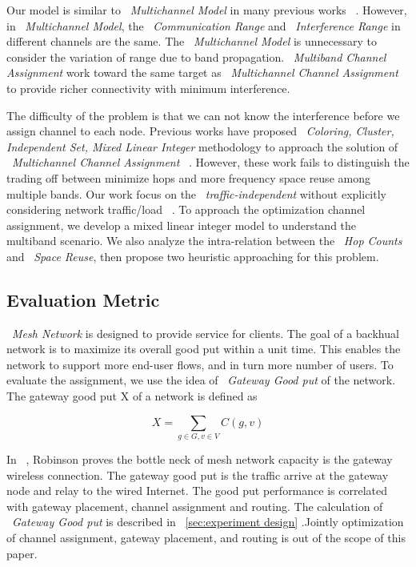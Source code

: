 Our model is similar to ~\emph{Multichannel Model} in many previous works ~\cite{tang2005interference,yuan2006cross,si2010overview}. However, in ~\emph{Multichannel Model}, the ~\emph{Communication Range} and ~\emph{Interference Range} in different channels are the same. The ~\emph{Multichannel Model} is unnecessary to consider the variation of range due to band propagation.
~\emph{Multiband Channel Assignment} work toward the same target as ~\emph{Multichannel Channel Assignment} to provide richer connectivity with minimum interference.

The difficulty of the problem is that we can not know the interference before we assign channel to each node. Previous works have proposed ~\emph{Coloring, Cluster, Independent Set, Mixed Linear Integer} methodology to approach the solution of ~\emph{Multichannel Channel Assignment} ~\cite{mishra2005weighted,peng2012efficient,tang2005interference}. 
However, these work fails to distinguish the trading off between minimize hops and more frequency space reuse among multiple bands.
Our work focus on the ~\emph{traffic-independent} 
without explicitly considering network traffic/load ~\cite{marina2010topology}.
To approach the optimization channel assignment, we develop a mixed linear integer model to understand the multiband scenario. We also analyze the intra-relation between the ~\emph{Hop Counts} and ~\emph{Space Reuse}, then propose two heuristic approaching for this problem.

\subsection{Evaluation Metric}
\label{subsec:metric}
~\emph{Mesh Network} is designed to provide service for clients. The goal of a backhual network is to maximize its overall good put within a unit time. 
This enables the network to support more end-user flows, and in turn more number of users. To evaluate the assignment, we use the idea of ~\emph{Gateway Good put} of the network. The gateway good put X of a network is defined as

\begin{equation}
\label{eq:goodput}
X=\sum_{g \in G, v \in V}C(g,v)
\end{equation}

In ~\cite{robinson2008adding}, Robinson proves the bottle neck of mesh network capacity is the gateway wireless connection. 
The gateway good put is the traffic arrive at the gateway node and relay to the wired Internet. The good put performance is correlated with gateway placement, channel assignment and routing. 
The calculation of ~\emph{Gateway Good put} is described in ~\ref{sec:experiment design} .Jointly optimization of channel assignment, gateway placement, and routing is out of the scope of this paper.

